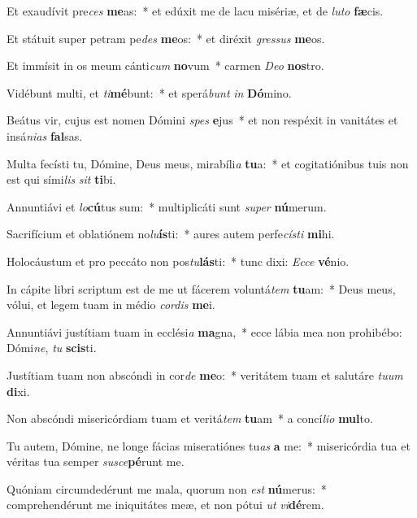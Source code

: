 \item Et exaudívit pre\textit{ces} \textbf{me}as:~* et edúxit me de lacu misériæ, et de \textit{lu}\textit{to} \textbf{fæ}cis.
\item Et státuit super petram pe\textit{des} \textbf{me}os:~* et diréxit \textit{gres}\textit{sus} \textbf{me}os.
\item Et immísit in os meum cánti\textit{cum} \textbf{no}vum~* carmen \textit{De}\textit{o} \textbf{nos}tro.
\item Vidébunt multi, et \textit{ti}\textbf{mé}bunt:~* et sperá\textit{bunt} \textit{in} \textbf{Dó}mino.
\item Beátus vir, cujus est nomen Dómini \textit{spes} \textbf{e}jus~* et non respéxit in vanitátes et insá\textit{ni}\textit{as} \textbf{fal}sas.
\item Multa fecísti tu, Dómine, Deus meus, mirabíli\textit{a} \textbf{tu}a:~* et cogitatiónibus tuis non est qui sími\textit{lis} \textit{sit} \textbf{ti}bi.
\item Annuntiávi et \textit{lo}\textbf{cú}tus sum:~* multiplicáti sunt \textit{su}\textit{per} \textbf{nú}merum.
\item Sacrifícium et oblatiónem no\textit{lu}\textbf{ís}ti:~* aures autem perfe\textit{cís}\textit{ti} \textbf{mi}hi.
\item Holocáustum et pro peccáto non pos\textit{tu}\textbf{lás}ti:~* tunc dixi: \textit{Ec}\textit{ce} \textbf{vé}nio.
\item In cápite libri scriptum est de me ut fácerem voluntá\textit{tem} \textbf{tu}am:~* Deus meus, vólui, et legem tuam in médio \textit{cor}\textit{dis} \textbf{me}i.
\item Annuntiávi justítiam tuam in ecclési\textit{a} \textbf{ma}gna,~* ecce lábia mea non prohibébo: Dómi\textit{ne}, \textit{tu} \textbf{scis}ti.
\item Justítiam tuam non abscóndi in cor\textit{de} \textbf{me}o:~* veritátem tuam et salutáre \textit{tu}\textit{um} \textbf{di}xi.
\item Non abscóndi misericórdiam tuam et veritá\textit{tem} \textbf{tu}am~* a concí\textit{li}\textit{o} \textbf{mul}to.
\item Tu autem, Dómine, ne longe fácias miseratiónes tu\textit{as} \textbf{a} me:~* misericórdia tua et véritas tua semper \textit{su}\textit{sce}\textbf{pé}runt me.
\item Quóniam circumdedérunt me mala, quorum non \textit{est} \textbf{nú}merus:~* comprehendérunt me iniquitátes meæ, et non pótui \textit{ut} \textit{vi}\textbf{dé}rem.
